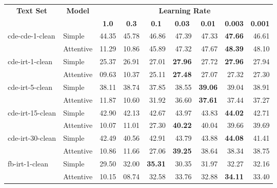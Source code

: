 \begin{tabular}{| l | l | r | r | r | r | r | r | r |}
    \hline

    \multicolumn{1}{|c|}{\multirow{2}{*}{\textbf{Text Set}}} &
    \multicolumn{1}{|c|}{\multirow{2}{*}{\textbf{Model}}} &
    \multicolumn{7}{|c|}{\textbf{Learning Rate}} \\

    &
    &
    \multicolumn{1}{|c|}{\textbf{1.0}} &
    \multicolumn{1}{|c|}{\textbf{0.3}} &
    \multicolumn{1}{|c|}{\textbf{0.1}} &
    \multicolumn{1}{|c|}{\textbf{0.03}} &
    \multicolumn{1}{|c|}{\textbf{0.01}} &
    \multicolumn{1}{|c|}{\textbf{0.003}} &
    \multicolumn{1}{|c|}{\textbf{0.001}} \\

    \hline \hline

    \multirow{2}{*}{cde-cde-1-clean}
    & Simple    & 44.35 & 45.78 & 46.86 & 47.39 & 47.33 & \textbf{47.66} & 46.61 \\
    & Attentive & 11.29 & 10.86 & 45.89 & 47.32 & 47.67 & \textbf{48.39} & 48.10 \\ \hline

    \multirow{2}{*}{cde-irt-1-clean}
    & Simple    & 25.37 & 26.91 & 27.01 & \textbf{27.96} & 27.72 & \textbf{27.96} & 27.94 \\
    & Attentive & 09.63 & 10.37 & 25.11 & \textbf{27.48} & 27.07 & 27.32 & 27.30 \\ \hline

    \multirow{2}{*}{cde-irt-5-clean}
    & Simple    & 38.11 & 38.74 & 37.85 & 38.55 & \textbf{39.06} & 39.04 & 38.91 \\
    & Attentive & 11.87 & 10.60 & 31.92 & 36.60 & \textbf{37.61} & 37.44 & 37.27 \\ \hline

    \multirow{2}{*}{cde-irt-15-clean}
    & Simple    & 42.90 & 42.13 & 42.67 & 43.97 & 43.83 & \textbf{44.02} & 42.71 \\
    & Attentive & 10.07 & 11.01 & 27.30 & \textbf{40.22} & 40.04 & 39.66 & 39.69 \\ \hline

    \multirow{2}{*}{cde-irt-30-clean}
    & Simple    & 42.49 & 40.56 & 42.91 & 43.79 & 43.88 & \textbf{44.08} & 41.41 \\
    & Attentive & 10.86 & 11.66 & 27.06 & \textbf{39.25} & 38.64 & 38.34 & 38.75 \\ \hline

    \multirow{2}{*}{fb-irt-1-clean}
    & Simple    & 29.50 & 32.00 & \textbf{35.31} & 30.35 & 31.97 & 32.27 & 32.16 \\
    & Attentive & 10.15 & 08.74 & 32.58 & 33.76 & 32.88 & \textbf{34.11} & 33.40 \\ \hline


\end{tabular}
